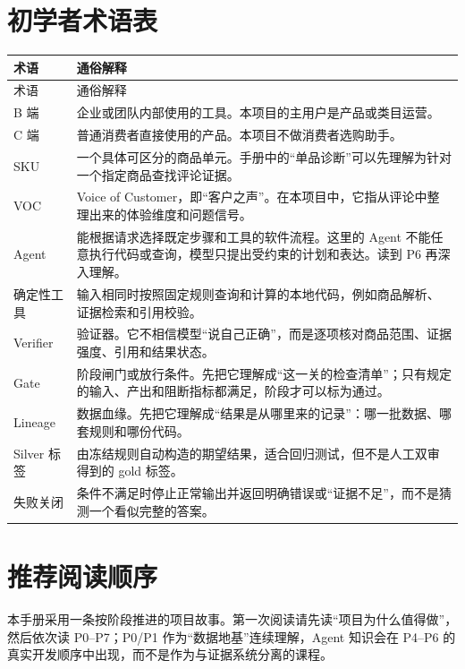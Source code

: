\section{初学者术语表}

\begin{longtable}{>{\raggedright\arraybackslash}p{}>{\raggedright\arraybackslash}p{}}
\toprule
术语 & 通俗解释 \\
\midrule
\endfirsthead
\toprule
术语 & 通俗解释 \\
\midrule
\endhead
B 端 & 企业或团队内部使用的工具。本项目的主用户是产品或类目运营。 \\
C 端 & 普通消费者直接使用的产品。本项目不做消费者选购助手。 \\
SKU & 一个具体可区分的商品单元。手册中的“单品诊断”可以先理解为针对一个指定商品查找评论证据。 \\
VOC & Voice of Customer，即“客户之声”。在本项目中，它指从评论中整理出来的体验维度和问题信号。 \\
Agent & 能根据请求选择既定步骤和工具的软件流程。这里的 Agent 不能任意执行代码或查询，模型只提出受约束的计划和表达。读到 P6 再深入理解。 \\
确定性工具 & 输入相同时按照固定规则查询和计算的本地代码，例如商品解析、证据检索和引用校验。 \\
Verifier & 验证器。它不相信模型“说自己正确”，而是逐项核对商品范围、证据强度、引用和结果状态。 \\
Gate & 阶段闸门或放行条件。先把它理解成“这一关的检查清单”；只有规定的输入、产出和阻断指标都满足，阶段才可以标为通过。 \\
Lineage & 数据血缘。先把它理解成“结果是从哪里来的记录”：哪一批数据、哪套规则和哪份代码。 \\
Silver 标签 & 由冻结规则自动构造的期望结果，适合回归测试，但不是人工双审得到的 gold 标签。 \\
失败关闭 & 条件不满足时停止正常输出并返回明确错误或“证据不足”，而不是猜测一个看似完整的答案。 \\
\bottomrule
\end{longtable}

\section{推荐阅读顺序}

本手册采用一条按阶段推进的项目故事。第一次阅读请先读“项目为什么值得做”，然后依次读 P0--P7；P0/P1 作为“数据地基”连续理解，Agent 知识会在 P4--P6 的真实开发顺序中出现，而不是作为与证据系统分离的课程。

